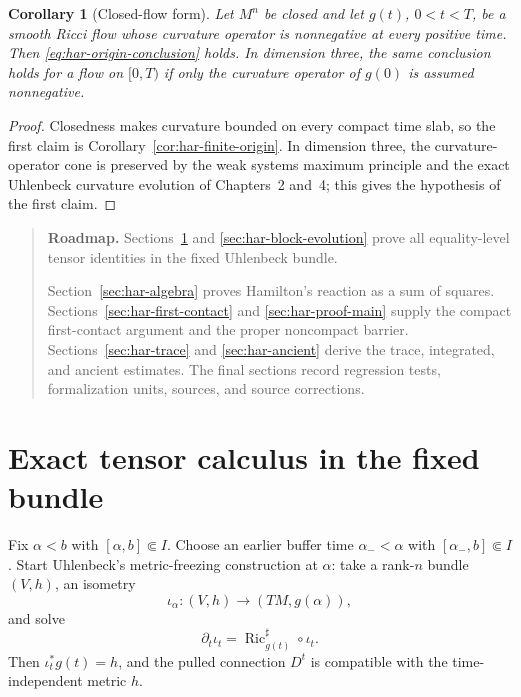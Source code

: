 \documentclass[10pt]{coll-l}
\newenvironment{roadmap}[1]{%
  \begin{quote}\small\noindent\textbf{Roadmap.} #1\par\medskip\noindent
}{\end{quote}}
\newtheorem{corollary}[theorem]{Corollary}
\theoremstyle{definition}
\theoremstyle{remark}
\numberwithin{section}{chapter}
\numberwithin{equation}{chapter}
\newcommand{\Ric}{\operatorname{Ric}}
\begin{document}
\begin{corollary}[Closed-flow form]
\label{cor:har-closed}
Let $M^n$ be closed and let $g(t)$, $0<t<T$, be a smooth Ricci flow whose
curvature operator is nonnegative at every positive time.  Then
\eqref{eq:har-origin-conclusion} holds.  In dimension three, the same
conclusion holds for a flow on $[0,T)$ if only the curvature operator of
$g(0)$ is assumed nonnegative.
\end{corollary}

\begin{proof}
Closedness makes curvature bounded on every compact time slab, so the first
claim is Corollary~\ref{cor:har-finite-origin}.  In dimension three, the
curvature-operator cone is preserved by the weak systems maximum principle
and the exact Uhlenbeck curvature evolution of Chapters~2 and~4; this gives
the hypothesis of the first claim.
\end{proof}

\begin{roadmap}{Sections~\ref{sec:har-fixed-calculus} and
\ref{sec:har-block-evolution} prove all equality-level tensor identities in
the fixed Uhlenbeck bundle.}
Section~\ref{sec:har-algebra} proves Hamilton's reaction as a sum of
squares.  Sections~\ref{sec:har-first-contact} and
\ref{sec:har-proof-main} supply the compact first-contact argument and the
proper noncompact barrier.  Sections~\ref{sec:har-trace} and
\ref{sec:har-ancient} derive the trace, integrated, and ancient estimates.
The final sections record regression tests, formalization units, sources,
and source corrections.
\end{roadmap}

\section{Exact tensor calculus in the fixed bundle}
\label{sec:har-fixed-calculus}

Fix $\alpha<b$ with $[\alpha,b]\Subset I$.  Choose an earlier buffer time
$\alpha_-<\alpha$ with $[\alpha_-,b]\Subset I$.  Start Uhlenbeck's
metric-freezing construction at $\alpha$: take a rank-$n$ bundle $(V,h)$,
an isometry
\[
       \iota_\alpha:(V,h)\longrightarrow(TM,g(\alpha)),
\]
and solve
\begin{equation}
       \partial_t\iota_t=\Ric_{g(t)}^\sharp\circ\iota_t. \label{eq:har-iota-ode}
\end{equation}
Then $\iota_t^*g(t)=h$, and the pulled connection $D^t$ is compatible with
the time-independent metric $h$.
\end{document}
